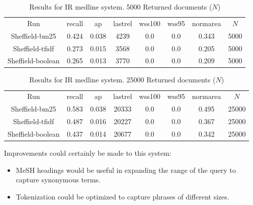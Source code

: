 \begin{table}[H]
\centering
\begin{tabular}{|c|c|c|c|c|c|c|c|} 
 \hline
 Run & recall &  ap & lastrel & wss100 & wss95 & normarea & $N$ \\ 
  Sheffield-bm25 & 0.424 &0.038 & 4239 &0.0 &0.0 & 0.343 & 5000 \\
  Sheffield-tfidf & 0.273 &0.015 & 3568 &0.0 &0.0 & 0.205 & 5000 \\
  Sheffield-boolean & 0.265 &0.013 & 3770 &0.0 &0.0 & 0.209 & 5000 \\
 \hline
\end{tabular}
\caption{Results for IR medline system. 5000 Returned documents ($N$)}
\end{table}

\begin{table}[H]
\centering
\begin{tabular}{|c|c|c|c|c|c|c|c|} 
 \hline
 Run & recall &  ap & lastrel & wss100 & wss95 & normarea & $N$ \\ 
  Sheffield-bm25 & 0.583 &0.038 & 20333 &0.0 &0.0 & 0.495 & 25000 \\
  Sheffield-tfidf & 0.487 &0.016 & 20227 &0.0 &0.0 & 0.367 & 25000 \\
  Sheffield-boolean & 0.437 &0.014 & 20677 &0.0 &0.0 & 0.342 & 25000 \\
 \hline
\end{tabular}
\caption{Results for IR medline system. 25000 Returned documents ($N$) }
\end{table}

Improvements could certainly be made to this system:

\begin{itemize}
  \item MeSH headings would be useful in expanding the range of the query to capture synonymous terms. 
  \item Tokenization could be optimized to capture phrases of different sizes.
\end{itemize}





